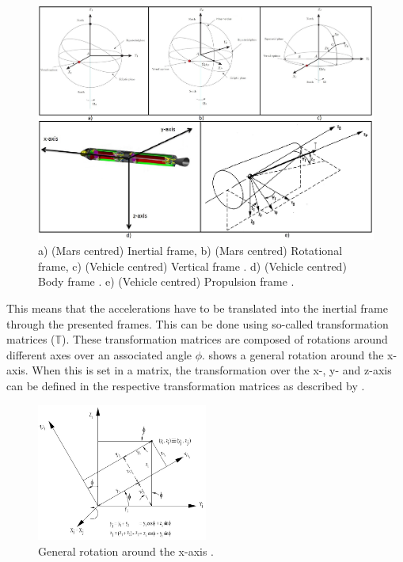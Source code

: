 \begin{figure}[H]
\centering
\includegraphics[width=1.0\textwidth]{figures/reference_frames/allFiveReferenceFrames_mooij2013fd-trinidad2012-mooij1994motion.jpg}
\caption{a) (Mars centred) Inertial frame, b) (Mars centred) Rotational frame, c) (Vehicle centred) Vertical frame \citep{mooij2013fd}. d) (Vehicle centred) Body frame \citep{trinidad2012}. e) (Vehicle centred) Propulsion frame \citep{mooij1994motion}.}
\label{fig:allFiveReferenceFrames_mooij2013fd-trinidad2012-mooij1994motion}
\end{figure}

\noindent
This means that the accelerations have to be translated into the inertial frame through the presented frames. This can be done using so-called transformation matrices ($\mathbb{T}$). These transformation matrices are composed of rotations around different axes over an associated angle $\phi$.  shows a general rotation around the x-axis. When this is set in a matrix, the transformation over the x-, y- and z-axis can be defined in the respective transformation matrices as described by . 


\begin{figure}[!ht]
\centering
\includegraphics[width=0.5\textwidth]{figures/reference_frames/xtrans_mooij2013stat.jpg}
\caption{General rotation around the x-axis \cite{mooij2013stat}.}
\label{fig:exampleXtrans_mooij2013stat}
\end{figure}


